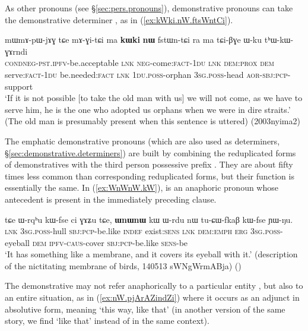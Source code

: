 As other pronouns (see §\ref{sec:pers.pronouns}), demonstrative pronouns can take the demonstrative determiner , as in (\ref{ex:kWki.nW.ftsWntCi}).

\begin{exe}
\ex \label{ex:kWki.nW.ftsWntCi}
 \gll mɯ\redp{}mɤ-pɯ-jɤɣ tɕe mɤ-ɣi-tɕi ma \textbf{kɯki} \textbf{nɯ} fstɯn-tɕi ra ma tɕi-βɣe ɯ-ku tʰɯ-kɯ-ɣɤrndi  \\
\textsc{cond}\redp{}\textsc{neg}-\textsc{pst}.\textsc{ipfv}-be.acceptable \textsc{lnk} \textsc{neg}-come:\textsc{fact}-\textsc{1du} \textsc{lnk} \textsc{dem}:\textsc{prox} \textsc{dem} serve:\textsc{fact}-\textsc{1du} be.needed:\textsc{fact} \textsc{lnk} \textsc{1du}.\textsc{poss}-orphan \textsc{3sg}.\textsc{poss}-head \textsc{aor}-\textsc{sbj}:\textsc{pcp}-support \\
\glt `If it is not possible [to take the old man with us] we will not come, as we have to serve him, he is the one who adopted us orphans when we were in dire straits.' (The old man is presumably present when this sentence is uttered) (2003nyima2)
\end{exe}

The emphatic demonstrative pronouns (which are also used as determiners, §\ref{sec:demonstrative.determiners}) are built by combining the reduplicated forms of demonstratives with the third person possessive prefix . They are about fifty times less common than corresponding reduplicated forms, but their function is essentially the same. In (\ref{ex:WnWnW.kW}),  is an anaphoric pronoun whose antecedent is present in the immediately preceding clause.

\begin{exe}
\ex \label{ex:WnWnW.kW}
 \gll
tɕe ɯ-rqʰu kɯ-fse ci ɣɤʑu tɕe, \textbf{ɯnɯnɯ} kɯ ɯ-rdu nɯ tu-ɕɯ-fkaβ kɯ-fse ɲɯ-ŋu. \\
\textsc{lnk} \textsc{3sg}.\textsc{poss}-hull \textsc{sbj}:\textsc{pcp}-be.like \textsc{indef}  exist:\textsc{sens} \textsc{lnk} \textsc{dem}:\textsc{emph} \textsc{erg} \textsc{3sg}.\textsc{poss}-eyeball \textsc{dem} \textsc{ipfv}-\textsc{caus}-cover  \textsc{sbj}:\textsc{pcp}-be.like \textsc{sens}-be \\
\glt `It has something like a membrane, and it covers its eyeball with it.' (description of the nictitating membrane of birds, 140513 sWNgWrmABja)
()
\end{exe}

The demonstrative  may not refer anaphorically to a particular entity , but also to an entire situation, as in (\ref{ex:nW.pjArAZindZi}) where it occurs as an adjunct in absolutive form, meaning `this way, like that' (in another version of the same story, we find  `like that' instead of  in the same context).

